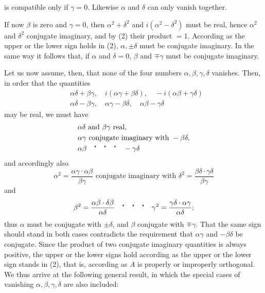 is compatible only if $\gamma = 0$. Likewise $\alpha$ and $\delta$ can
only vanish together.

If now $\beta$ is zero and $\gamma = 0$, then $\alpha^2 + \delta^2$ and $i(\alpha^2 - \delta^2)$
must be real, hence $\alpha^2$ and $\delta^2$ conjugate imaginary, and by (2) their
product $= 1$. According as the upper or the lower
sign holds in (2), $\alpha, \pm\delta$ must be conjugate imaginary. In the same way
it follows that, if $\alpha$ and $\delta = 0$, $\beta$ and $\mp\gamma$ must be conjugate
imaginary.

Let us now assume, then, that none of the four numbers $\alpha, \beta, \gamma, \delta$
vanishes. Then, in order that the quantities
\[
\begin{aligned}
&\alpha\delta+\beta\gamma,\quad i(\alpha\gamma+\beta\delta),\quad -i(\alpha\beta+\gamma\delta)\\
&\alpha\delta-\beta\gamma,\quad \alpha\gamma-\beta\delta,\quad \alpha\beta-\gamma\delta
\end{aligned}
\]
may be real, we must have
\[
\begin{aligned}
&\alpha\delta \text{ and } \beta\gamma \text{ real,}\\
&\alpha\gamma \text{ conjugate imaginary with } -\beta\delta,\\
&\alpha\beta \quad \text{\textquotedbl{}}\quad \text{\textquotedbl{}}\quad \text{\textquotedbl{}}\quad -\gamma\delta
\end{aligned}
\]
and accordingly also
\[
\alpha^2 = \frac{\alpha\gamma \cdot \alpha\beta}{\beta\gamma} \text{ conjugate imaginary with } \delta^2 = \frac{\beta\delta \cdot \gamma\delta}{\beta\gamma}
\]
and
\[
\beta^2 = \frac{\alpha\beta \cdot \delta\beta}{\alpha\delta} \quad \text{\textquotedbl{}}\quad \text{\textquotedbl{}}\quad \text{\textquotedbl{}}\quad \gamma^2 = \frac{\gamma\delta \cdot \alpha\gamma}{\alpha\delta};
\]
thus $\alpha$ must be conjugate with $\pm\delta$, and $\beta$ conjugate with $\mp\gamma$. That
the same sign should stand in both cases contradicts the requirement
that $\alpha\gamma$ and $-\beta\delta$ be conjugate. Since the product
of two conjugate imaginary quantities is always positive, the upper
or the lower signs hold according as the upper or the lower
sign stands in (2), that is, according as $A$ is properly
or improperly orthogonal. We thus arrive at
the following general result, in which the special
cases of vanishing $\alpha, \beta, \gamma, \delta$ are also included:


